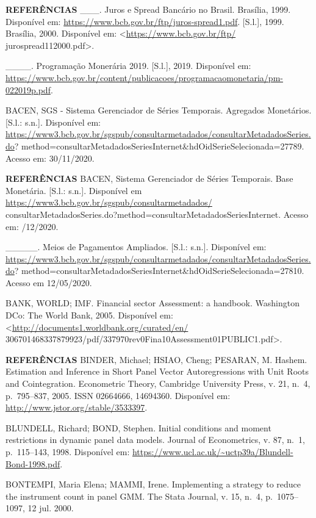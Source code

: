 \documentclass[
  ignorenonframetext,
  aspectratio=169,
  ignorenonframetext]{beamer}
\begin{document}
\begin{frame}{\textbf{REFERÊNCIAS}}
\protect\hypertarget{referuxeancias-2}{}
\_\_\_. Juros e Spread Bancário no Brasil. Brasília, 1999. Disponível
em: \url{https://www.bcb.gov.br/ftp/juros-spread1.pdf}. {[}S.l.{]},
1999. Brasília, 2000. Disponível em:
\textless{}\url{https://www.bcb.gov.br/ftp/}
jurospread112000.pdf\textgreater.

\_\_\_\_. Programação Monerária 2019. {[}S.l.{]}, 2019. Disponível em:
\url{https://www.bcb.gov.br/content/publicacoes/programacaomonetaria/pm-022019p.pdf}.

BACEN, SGS - Sistema Gerenciador de Séries Temporais. Agregados
Monetários. {[}S.l.: s.n.{]}. Disponível em:
\url{https://www3.bcb.gov.br/sgspub/consultarmetadados/consultarMetadadosSeries.do}?
method=consultarMetadadosSeriesInternet\&hdOidSerieSelecionada=27789.
Acesso em: 30/11/2020.
\end{frame}

\begin{frame}{\textbf{REFERÊNCIAS}}
\protect\hypertarget{referuxeancias-3}{}
BACEN, Sistema Gerenciador de Séries Temporais. Base Monetária. {[}S.l.:
s.n.{]}. Disponível em
\url{https://www3.bcb.gov.br/sgspub/consultarmetadados/}
consultarMetadadosSeries.do?method=consultarMetadadosSeriesInternet.
Acesso em: /12/2020.

\_\_\_\_\_. Meios de Pagamentos Ampliados. {[}S.l.: s.n.{]}. Disponível
em:
\url{https://www3.bcb.gov.br/sgspub/consultarmetadados/consultarMetadadosSeries.do}?
method=consultarMetadadosSeriesInternet\&hdOidSerieSelecionada=27810.
Acesso em 12/05/2020.

BANK, WORLD; IMF. Financial sector Assessment: a handbook. Washington
DCo: The World Bank, 2005. Disponível em:
\textless{}\url{http://documents1.worldbank.org/curated/en/}
306701468337879923/pdf/337970rev0Fina10Assessment01PUBLIC1.pdf\textgreater.
\end{frame}

\begin{frame}{\textbf{REFERÊNCIAS}}
\protect\hypertarget{referuxeancias-4}{}
BINDER, Michael; HSIAO, Cheng; PESARAN, M. Hashem. Estimation and
Inference in Short Panel Vector Autoregressions with Unit Roots and
Cointegration. Econometric Theory, Cambridge University Press, v. 21,
n.~4, p.~795--837, 2005. ISSN 02664666, 14694360. Disponível em:
\url{http://www.jstor.org/stable/3533397}.

BLUNDELL, Richard; BOND, Stephen. Initial conditions and moment
restrictions in dynamic panel data models. Journal of Econometrics, v.
87, n.~1, p.~115--143, 1998. Disponível em:
\url{https://www.ucl.ac.uk/~uctp39a/Blundell-Bond-1998.pdf}.

BONTEMPI, Maria Elena; MAMMI, Irene. Implementing a strategy to reduce
the instrument count in panel GMM. The Stata Journal, v. 15, n.~4,
p.~1075--1097, 12 jul. 2000.
\end{frame}
\end{document}
